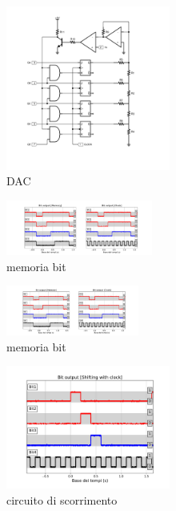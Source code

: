 \documentclass[journal]{IEEEtran}
\begin{document}
\begin{figure}[H]%
\begin{center}
\includegraphics[width=0.48\textwidth]{sch-simulations/digital/output/DAC.pdf}
\caption{DAC}
\label{fig:circuit_DAC}
\end{center}
\end{figure}

\begin{figure}[H]%
\begin{center}
\includegraphics[trim = {100 0 550 0}, clip, width=0.43\textwidth]{analysis/output/cumulative_BIT.pdf}
\caption{memoria bit}
\label{fig:cumulative_BIT}
\end{center}
\end{figure}

\begin{figure}[H]%
\begin{center}
\includegraphics[trim = {600 0 100 0}, clip, width=0.39\textwidth]{analysis/output/cumulative_BIT.pdf}
\caption{memoria bit}
\label{fig:cumulative_BIT}
\end{center}
\end{figure}


\begin{figure}[H]%
\begin{center}
\includegraphics[width=0.48\textwidth]{analysis/output/BIT-shift-clk.pdf}
\caption{circuito di scorrimento}
\label{fig:BIT_shift_clk}
\end{center}
\end{figure}
\end{document}
